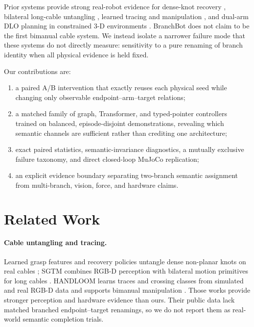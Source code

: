 \documentclass[journal]{IEEEtran}
\begin{document}
Prior systems provide strong real-robot evidence for dense-knot recovery
\cite{sundaresan2021untangling}, bilateral long-cable untangling
\cite{viswanath2022long}, learned tracing and manipulation
\cite{viswanath2023handloom}, and dual-arm DLO planning in constrained 3-D
environments \cite{yu2022coarse,yu2023wholebody}.  BranchBot does not claim to
be the first bimanual cable system.  We instead isolate a narrower failure
mode that these systems do not directly measure: sensitivity to a pure
renaming of branch identity when all physical evidence is held fixed.

Our contributions are:

\begin{enumerate}
  \item a paired A/B intervention that exactly reuses each physical seed while
  changing only observable endpoint--arm--target relations;
  \item a matched family of graph, Transformer, and typed-pointer controllers
  trained on balanced, episode-disjoint demonstrations, revealing which
  semantic channels are sufficient rather than crediting one architecture;
  \item exact paired statistics, semantic-invariance diagnostics, a mutually
  exclusive failure taxonomy, and direct closed-loop MuJoCo replication;
  \item an explicit evidence boundary separating two-branch semantic
  assignment from multi-branch, vision, force, and hardware claims.
\end{enumerate}

\section{Related Work}

\paragraph{Cable untangling and tracing.}
Learned grasp features and recovery policies untangle dense non-planar knots
on real cables \cite{sundaresan2021untangling}; SGTM combines RGB-D perception
with bilateral motion primitives for long cables \cite{viswanath2022long}.
HANDLOOM learns traces and crossing classes from simulated and real RGB-D data
and supports bimanual manipulation \cite{viswanath2023handloom}.  Those works
provide stronger perception and hardware evidence than ours.  Their public
data lack matched branched endpoint--target renamings, so we do not report them
as real-world semantic completion trials.
\end{document}
